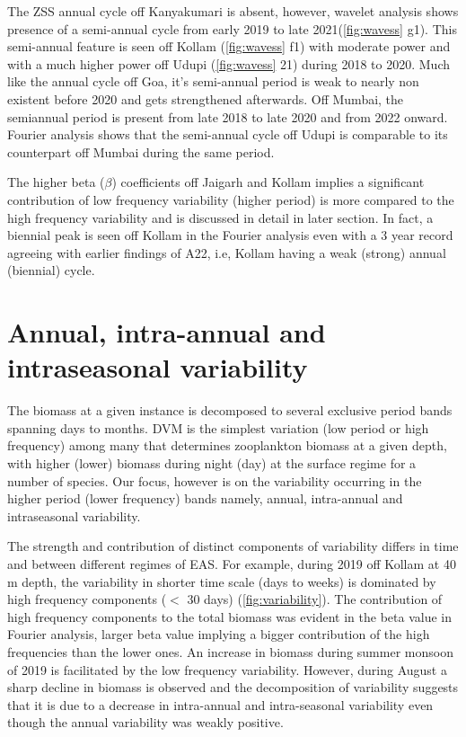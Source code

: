 \documentclass{article}
\begin{document}
	The ZSS annual cycle off Kanyakumari is absent, however, wavelet analysis shows presence of a semi-annual cycle from early 2019 to late 2021(\cref{fig:wavess} g1). This semi-annual feature is seen off Kollam (\cref{fig:wavess} f1) with moderate power and with a much higher power off Udupi (\cref{fig:wavess} 21) during 2018 to 2020. Much like the annual cycle off Goa, it's semi-annual period is weak to nearly non existent before 2020 and gets strengthened afterwards. Off Mumbai, the semiannual period is present from late 2018 to late 2020 and from 2022 onward. Fourier analysis shows that the semi-annual cycle off Udupi is comparable to its counterpart off Mumbai during the same period. 

	The higher beta ($\beta$) coefficients off Jaigarh and Kollam implies a significant contribution of low frequency variability (higher period) is more compared to the high frequency variability and is discussed in detail in later section. In fact, a biennial peak is seen off Kollam in the Fourier analysis even with a 3 year record agreeing with earlier findings of A22, i.e, Kollam having a weak (strong) annual (biennial) cycle. 


	\section{Annual, intra-annual and intraseasonal variability}
	\label{vari}
	The biomass at a given instance is decomposed to several exclusive period bands spanning days to months. DVM is the simplest variation (low period or high frequency) among many that determines zooplankton biomass at a given depth, with higher (lower) biomass during night (day) at the surface regime for a number of species. Our focus, however is on the variability occurring in the higher period (lower frequency) bands namely, annual, intra-annual and intraseasonal variability. 
	
	The strength and contribution of distinct components of variability differs in time and between different regimes of EAS. For example, during 2019 off Kollam at 40 m depth, the variability in shorter time scale (days to weeks) is dominated by high frequency components ($<$ 30 days) (\cref{fig:variability}). The contribution of high frequency components to the total biomass was evident in the beta value in Fourier analysis, larger beta value implying a bigger contribution of the high frequencies	than the lower ones. An increase in biomass during summer monsoon of 2019 is facilitated by the low frequency variability. However, during August a sharp decline in biomass is observed and the decomposition of variability suggests that it is due to a decrease in intra-annual and intra-seasonal variability even though the annual variability was weakly positive. 
\end{document}
